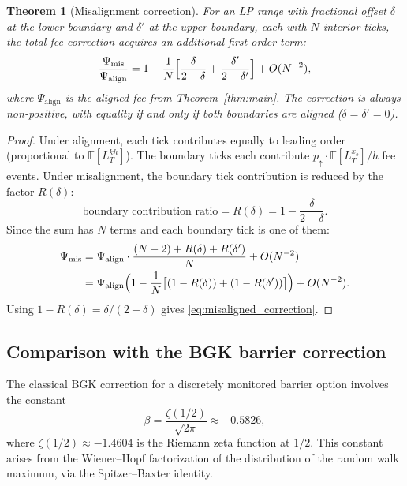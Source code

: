 \documentclass[11pt]{article}
\newtheorem{theorem}{Theorem}[section]
\theoremstyle{definition}
\theoremstyle{remark}
\newcommand{\E}{\mathbb{E}}
\begin{document}
\begin{theorem}[Misalignment correction]\label{thm:misaligned}
For an LP range with fractional offset $\delta$ at the lower boundary
and $\delta'$ at the upper boundary, each with $N$ interior ticks, the
total fee correction acquires an additional first-order term:
\begin{equation}\label{eq:misaligned_correction}
\frac{\Psi_{\mathrm{mis}}}{\Psi_{\mathrm{align}}}
= 1 - \frac{1}{N}\Bigl[\frac{\delta}{2-\delta}
+ \frac{\delta'}{2-\delta'}\Bigr] + O(N^{-2}),
\end{equation}
where $\Psi_{\mathrm{align}}$ is the aligned fee from
Theorem~\ref{thm:main}. The correction is always non-positive,
with equality if and only if both boundaries are aligned
($\delta = \delta' = 0$).
\end{theorem}
\begin{proof}
Under alignment, each tick contributes equally to leading order
(proportional to $\E[L^{kh}_T]$). The boundary ticks each contribute
$p_\uparrow \cdot \E[L^{x_b}_T]/h$ fee events. Under misalignment,
the boundary tick contribution is reduced by the factor $R(\delta)$:
\[
\text{boundary contribution ratio}
= R(\delta) = 1 - \frac{\delta}{2-\delta}.
\]
Since the sum has $N$ terms and each boundary tick is one of them:
\begin{align*}
\Psi_{\mathrm{mis}} &= \Psi_{\mathrm{align}}
\cdot \frac{(N-2) + R(\delta) + R(\delta')}{N} + O(N^{-2}) \\
&= \Psi_{\mathrm{align}} \Bigl(1 - \frac{1}{N}
\bigl[(1 - R(\delta)) + (1 - R(\delta'))\bigr]\Bigr) + O(N^{-2}).
\end{align*}
Using $1 - R(\delta) = \delta/(2-\delta)$ gives
\eqref{eq:misaligned_correction}.
\end{proof}

\subsection{Comparison with the BGK barrier correction}

The classical BGK correction for a discretely monitored barrier option
involves the constant
\begin{equation}\label{eq:bgk_beta}
\beta = \frac{\zeta(1/2)}{\sqrt{2\pi}} \approx -0.5826,
\end{equation}
where $\zeta(1/2) \approx -1.4604$ is the Riemann zeta function at
$1/2$. This constant arises from the Wiener--Hopf factorization of
the distribution of the random walk maximum, via the Spitzer--Baxter
identity.
\end{document}
